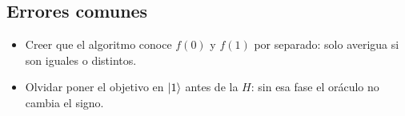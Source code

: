 \subsection{Errores comunes}
\begin{itemize}
  \item Creer que el algoritmo conoce $f(0)$ y $f(1)$ por separado: solo
    averigua si son iguales o distintos.
  \item Olvidar poner el objetivo en $\left|1\right\rangle$ antes de la $H$: sin esa fase
    el oráculo no cambia el signo.
\end{itemize}


